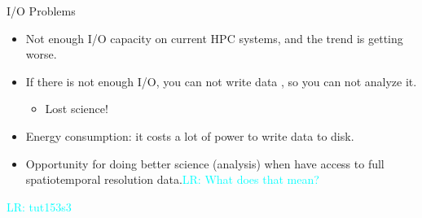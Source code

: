 \documentclass[compress,11pt,xcolor=svgnames,aspectratio=169]{beamer}
\newcommand{\lr}[1]{\textcolor{cyan}{LR: #1}}
\begin{document}
\begin{frame}[fragile] {I/O Problems}

\begin{itemize}
\setlength\itemsep{0.7cm}

\item Not enough I/O capacity on current HPC systems, and the trend is getting worse.

\item If there is not enough I/O, you can not write data%
, so you can not analyze it.
    \begin{itemize}
        \item Lost science!
    \end{itemize}

\item Energy consumption: it costs a lot of power to write data to disk.

\item Opportunity for doing better science (analysis) when have access to full spatiotemporal resolution data.\lr{What does that mean?}

\end{itemize}

\begin{center}
\end{center}

\lr{tut153s3}

\end{frame}
\end{document}
